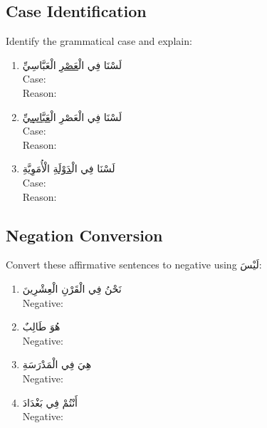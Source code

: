 \documentclass[letterpaper,12pt]{article}
\begin{document}
\subsection{Case Identification}

Identify the grammatical case and explain:

\begin{enumerate}
\item \textarabic{لَسْنَا فِي الْ\underline{عَصْرِ} الْعَبَّاسِيِّ}\\
Case: \underline{\hspace{8cm}}\\
Reason: \underline{\hspace{8cm}}

\item \textarabic{لَسْنَا فِي الْعَصْرِ الْ\underline{عَبَّاسِيِّ}}\\
Case: \underline{\hspace{8cm}}\\
Reason: \underline{\hspace{8cm}}

\item \textarabic{لَسْنَا فِي الْ\underline{دَوْلَةِ} الْأُمَوِيَّةِ}\\
Case: \underline{\hspace{8cm}}\\
Reason: \underline{\hspace{8cm}}
\end{enumerate}

\subsection{Negation Conversion}

Convert these affirmative sentences to negative using \textarabic{لَيْسَ}:

\begin{enumerate}
\item \textarabic{نَحْنُ فِي الْقَرْنِ الْعِشْرِينَ}\\
Negative: \underline{\hspace{10cm}}

\item \textarabic{هُوَ طَالِبٌ}\\
Negative: \underline{\hspace{10cm}}

\item \textarabic{هِيَ فِي الْمَدْرَسَةِ}\\
Negative: \underline{\hspace{10cm}}

\item \textarabic{أَنْتُمْ فِي بَغْدَادَ}\\
Negative: \underline{\hspace{10cm}}
\end{enumerate}
\end{document}
